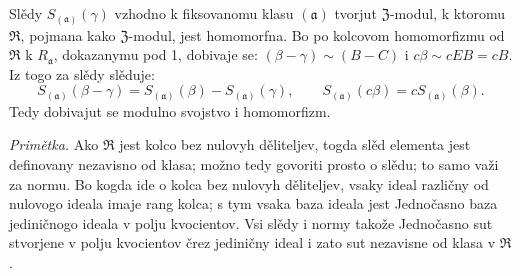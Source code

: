 \documentclass[11pt]{article}
\begin{document}
\setcounter{footnote}{26}

Slědy $S_{(\mathfrak a)}(\gamma)$ vzhodno k fiksovanomu klasu $(\mathfrak a)$ tvorjut $\mathfrak Z$-modul, k ktoromu $\mathfrak R$, pojmana kako $\mathfrak Z$-modul, jest homomorfna. Bo po kolcovom homomorfizmu od $\mathfrak R$ k $R_{\mathfrak a}$, dokazanymu pod 1, dobivaje se: $(\beta-\gamma)\sim(B-C)$ i $c\beta\sim cEB=cB$. Iz togo za slědy slěduje:
\[
        S_{(\mathfrak a)}(\beta-\gamma)=S_{(\mathfrak a)}(\beta)-S_{(\mathfrak a)}(\gamma),
        \qquad
        S_{(\mathfrak a)}(c\beta)=cS_{(\mathfrak a)}(\beta).
\]
Tedy dobivajut se modulno svojstvo i homomorfizm.

\emph{Primětka.} Ako $\mathfrak R$ jest kolco bez nulovyh děliteljev, togda slěd elementa jest definovany nezavisno od klasa; možno tedy govoriti prosto o slědu; to samo važi za normu. Bo kogda ide o kolca bez nulovyh děliteljev, vsaky ideal različny od nulovogo ideala imaje rang kolca; s tym vsaka baza ideala jest Jednočasno baza jediničnogo ideala v polju kvocientov. Vsi slědy i normy takože Jednočasno sut stvorjene v polju kvocientov črez jediničny ideal i zato sut nezavisne od klasa v $\mathfrak R$.
\end{document}
